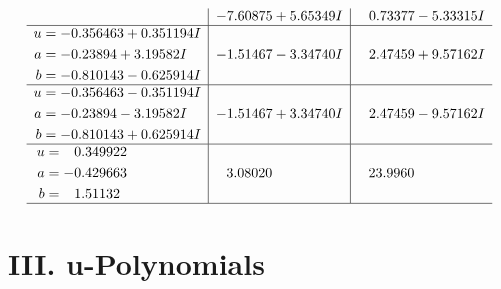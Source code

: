 \documentclass[1p]{elsarticle_modified}
\theoremstyle{definition}
\begin{document}
$$\begin{array}{c|c|c}
 & -7.60875 + 5.65349 I & \phantom{-}0.73377 - 5.33315 I \\ \hline\begin{aligned}
u &= -0.356463 + 0.351194 I \\
a &= -0.23894 + 3.19582 I \\
b &= -0.810143 - 0.625914 I\end{aligned}
 & -1.51467 - 3.34740 I & \phantom{-}2.47459 + 9.57162 I \\ \hline\begin{aligned}
u &= -0.356463 - 0.351194 I \\
a &= -0.23894 - 3.19582 I \\
b &= -0.810143 + 0.625914 I\end{aligned}
 & -1.51467 + 3.34740 I & \phantom{-}2.47459 - 9.57162 I \\ \hline\begin{aligned}
u &= \phantom{-}0.349922\phantom{ +0.000000I} \\
a &= -0.429663\phantom{ +0.000000I} \\
b &= \phantom{-}1.51132\phantom{ +0.000000I}\end{aligned}
 & \phantom{-}3.08020\phantom{ +0.000000I} & \phantom{-}23.9960\phantom{ +0.000000I}\\
 \hline 
 \end{array}$$\newpage
\newpage\renewcommand{\arraystretch}{1}
\centering \section*{ III. u-Polynomials}
\end{document}
